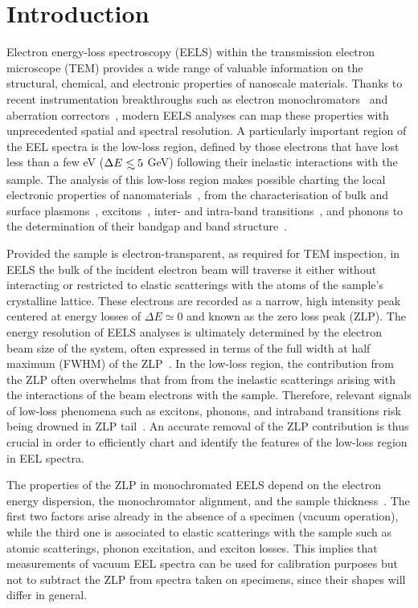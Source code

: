 \section{Introduction}
\label{sec:introduction}

Electron energy-loss spectroscopy (EELS) within the transmission electron microscope (TEM) provides
a wide range of
valuable information on the structural, chemical, and electronic properties of nanoscale materials.
%
Thanks to recent instrumentation breakthroughs
such as electron monochromators~\cite{Terauchi:2005, Freitag:2005} and aberration correctors~\cite{Haider:1998},
modern EELS analyses can map these properties with unprecedented spatial and spectral resolution.
%
A particularly important region of the EEL spectra is
the low-loss region, defined by those electrons that have lost
less than a few eV ($\Delta E\lsim 5$ GeV) following their inelastic interactions
with the sample.
%
The analysis of this low-loss region makes possible charting the local
electronic properties of nanomaterials~\cite{Geiger:1967}, from the characterisation of
bulk and surface plasmons~\cite{Schaffer:2008}, excitons~\cite{Erni:2005}, 
inter- and intra-band transitions~\cite{Rafferty:1998},
and phonons to the determination of their bandgap and band structure~\cite{Stoger:2008}.

Provided the sample is electron-transparent, as required for TEM inspection,
in EELS the bulk of the incident electron beam will traverse it
either without interacting or restricted to elastic scatterings with the atoms
of the sample's crystalline lattice.
%
These electrons are recorded as a narrow,
 high intensity peak centered at energy losses
of $\Delta E\simeq 0$ and known as the zero loss peak (ZLP).
%
The energy resolution of EELS analyses is ultimately determined by
the electron beam size of the system, often expressed in terms
of the full width at half maximum (FWHM) of the
ZLP~\cite{Egerton:2009}.
%
In the low-loss region, the contribution from the ZLP
often overwhelms that from  from the inelastic scatterings arising with
the interactions of the beam electrons
with the sample.
%
Therefore, relevant signals of low-loss phenomena such as excitons,
phonons, and intraband transitions risk being drowned
in ZLP tail~\cite{Abajo:2010}.
%
An accurate removal of the ZLP
contribution is thus crucial  in order to efficiently chart and identify the  features
of the low-loss  region in EEL spectra. 

The properties of the ZLP in monochromated EELS depend on the electron energy dispersion,
the monochromator alignment, and the sample thickness~\cite{Park:2008, Stoger:2008}.
%
The first two factors arise already in the absence of a specimen (vacuum operation),
while the third one is associated
to elastic scatterings with the sample such as atomic scatterings,
phonon excitation, and exciton losses.
%
This implies that  measurements of vacuum EEL spectra can be used for calibration purposes
but not to subtract the ZLP from spectra taken on specimens, since their shapes will differ
in general.

